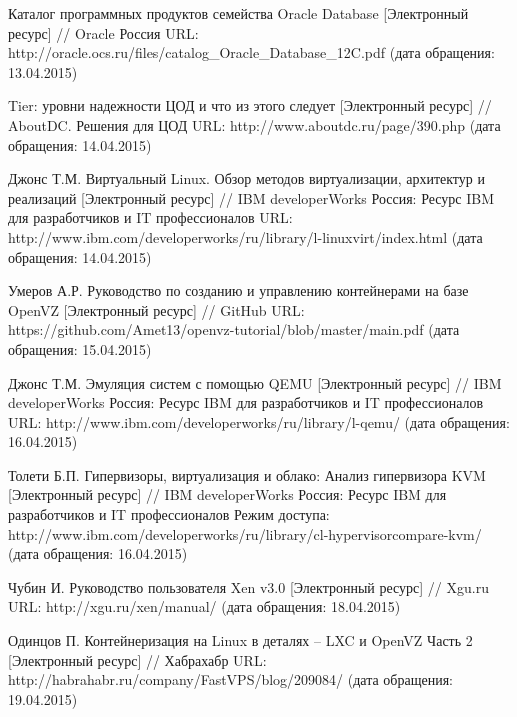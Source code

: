 \begingroup 
\renewcommand{\section}[2]{\anonsection{Список используемых источников}}
\begin{thebibliography}{00}

    Каталог программных продуктов семейства Oracle Database
    [Электронный ресурс] //
    Oracle Россия
    URL: http://oracle.ocs.ru/files/catalog\_Oracle\_Database\_12C.pdf
    (дата обращения: 13.04.2015)

    Tier: уровни надежности ЦОД и что из этого следует
    [Электронный ресурс] //
    AboutDC. Решения для ЦОД
    URL: http://www.aboutdc.ru/page/390.php
    (дата обращения: 14.04.2015)

    Джонс Т.М.
    Виртуальный Linux. Обзор методов виртуализации, архитектур и реализаций
    [Электронный ресурс] //
    IBM developerWorks Россия: Ресурс IBM для разработчиков и IT профессионалов
    URL: http://www.ibm.com/developerworks/ru/library/l-linuxvirt/index.html
    (дата обращения: 14.04.2015)

    Умеров А.Р.
    Руководство по созданию и управлению контейнерами на базе OpenVZ 
    [Электронный ресурс] //
    GitHub
    URL: https://github.com/Amet13/openvz-tutorial/blob/master/main.pdf
    (дата обращения: 15.04.2015)

    Джонс Т.М.
    Эмуляция систем с помощью QEMU
    [Электронный ресурс] //
    IBM developerWorks Россия: Ресурс IBM для разработчиков и IT профессионалов
    URL: http://www.ibm.com/developerworks/ru/library/l-qemu/
    (дата обращения: 16.04.2015)

    Толети Б.П.
    Гипервизоры, виртуализация и облако: Анализ гипервизора KVM
    [Электронный ресурс] //
    IBM developerWorks Россия: Ресурс IBM для разработчиков и IT профессионалов
    Режим доступа: http://www.ibm.com/developerworks/ru/library/cl-hypervisorcompare-kvm/
    (дата обращения: 16.04.2015)

    Чубин И.
    Руководство пользователя Xen v3.0
    [Электронный ресурс] //
    Xgu.ru
    URL: http://xgu.ru/xen/manual/
    (дата обращения: 18.04.2015)

    Одинцов П.
    Контейнеризация на Linux в деталях -- LXC и OpenVZ Часть 2
    [Электронный ресурс] //
    Хабрахабр
    URL: http://habrahabr.ru/company/FastVPS/blog/209084/
    (дата обращения: 19.04.2015)


\end{thebibliography}
